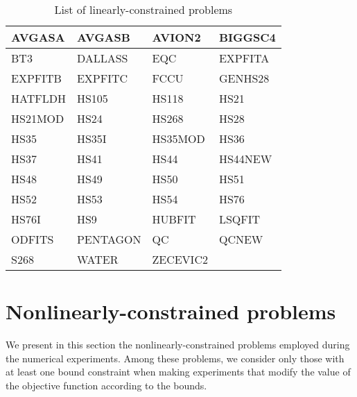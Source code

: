 \begin{longtable}{llll}
    \caption{List of linearly-constrained problems}\\
    \toprule
    AVGASA  & AVGASB    & AVION2    & BIGGSC4\\
    \midrule
    BT3     & DALLASS   & EQC       & EXPFITA\\
    \midrule
    EXPFITB & EXPFITC   & FCCU      & GENHS28\\
    \midrule
    HATFLDH & HS105     & HS118     & HS21\\
    \midrule
    HS21MOD & HS24      & HS268     & HS28\\
    \midrule
    HS35    & HS35I     & HS35MOD   & HS36\\
    \midrule
    HS37    & HS41      & HS44      & HS44NEW\\
    \midrule
    HS48    & HS49      & HS50      & HS51\\
    \midrule
    HS52    & HS53      & HS54      & HS76\\
    \midrule
    HS76I   & HS9       & HUBFIT    & LSQFIT\\
    \midrule
    ODFITS  & PENTAGON  & QC        & QCNEW\\
    \midrule
    S268    & WATER     & ZECEVIC2\\
    \bottomrule
\end{longtable}

\section{Nonlinearly-constrained problems}

We present in this section the nonlinearly-constrained problems employed during the numerical experiments.
Among these problems, we consider only those with at least one bound constraint when making experiments that modify the value of the objective function according to the bounds.

